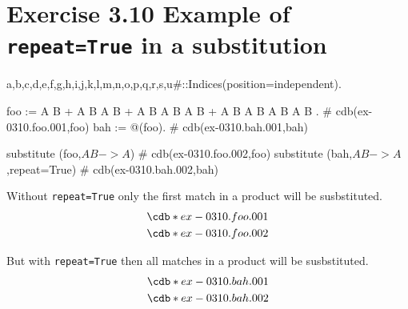 \documentclass[12pt]{cdblatex}
\begin{document}
\section*{Exercise 3.10 Example of {\tt repeat=True} in a substitution}

\begin{cadabra}
   {a,b,c,d,e,f,g,h,i,j,k,l,m,n,o,p,q,r,s,u#}::Indices(position=independent).

   foo := A B + A B A B + A B A B A B + A B A B A B A B .   # cdb(ex-0310.foo.001,foo)
   bah := @(foo).                                           # cdb(ex-0310.bah.001,bah)

   substitute (foo,$A B -> A$)                              # cdb(ex-0310.foo.002,foo)
   substitute (bah,$A B -> A$,repeat=True)                  # cdb(ex-0310.bah.002,bah)
\end{cadabra}

\vskip 1cm

Without {\tt repeat=True} only the first match in a product will be susbstituted.
\begin{align*}
   &\cdb*{ex-0310.foo.001}\\
   &\cdb*{ex-0310.foo.002}
\end{align*}

But with {\tt repeat=True} then all matches in a product will be susbstituted.
\begin{align*}
   &\cdb*{ex-0310.bah.001}\\
   &\cdb*{ex-0310.bah.002}
\end{align*}
\end{document}
